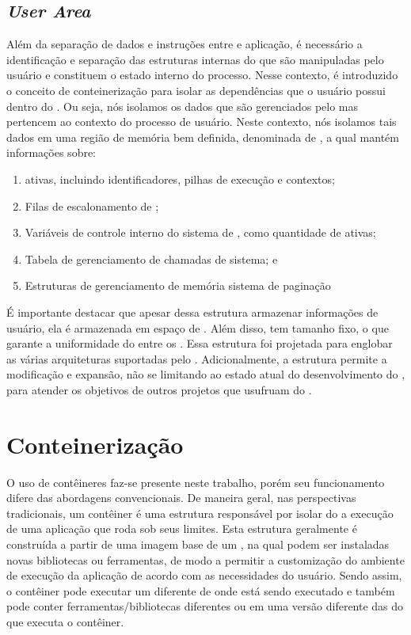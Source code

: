 \subsection{\textit{User Area}}
\label{sec.uarea}

    Além da separação de dados e instruções entre  e aplicação, é necessário a identificação e separação das estruturas internas do \so que são manipuladas pelo usuário e constituem o estado interno do processo. Nesse contexto, é introduzido o conceito de conteinerização para isolar as dependências que o usuário possui dentro do \cluster. Ou seja, nós isolamos os dados que são gerenciados pelo  mas pertencem ao contexto do processo de usuário. Neste contexto, nós isolamos tais dados em uma região de memória bem definida, denominada de \uarea, a qual mantém informações sobre:
    \begin{enumerate}[label=(\roman*)]
        \item \Threads ativas, incluindo identificadores, pilhas de execução e contextos;
        \item Filas de escalonamento de \threads;
        \item Variáveis de controle interno do sistema de \threads, como quantidade de \threads ativas;
        \item Tabela de gerenciamento de chamadas de sistema; e
        \item Estruturas de gerenciamento de memória \eg sistema de paginação
    \end{enumerate}

    É importante destacar que apesar dessa estrutura armazenar informações de usuário, ela é armazenada em espaço de . Além disso, tem tamanho fixo, o que garante a uniformidade do  entre os \clusters. Essa estrutura foi projetada para englobar as várias arquiteturas suportadas pelo \nanvix. Adicionalmente, a estrutura permite a modificação e expansão, não se limitando ao estado atual do desenvolvimento do \nanvix, para atender os objetivos de outros projetos que usufruam do \nanvix.

\section{Conteinerização}
O uso de contêineres faz-se presente neste trabalho, porém seu funcionamento difere das abordagens convencionais. De maneira geral, nas perspectivas tradicionais, um contêiner é uma estrutura responsável por isolar do \so a execução de uma aplicação que roda sob seus limites. Esta estrutura geralmente é construída a partir de uma imagem base de um \so, na qual podem ser instaladas novas bibliotecas ou ferramentas, de modo a permitir a customização do ambiente de execução da aplicação de acordo com as necessidades do usuário. Sendo assim, o contêiner pode executar um \so diferente de onde está sendo executado e também pode conter ferramentas/bibliotecas diferentes ou em uma versão diferente das do \so que executa o contêiner.

